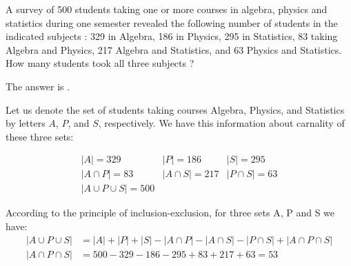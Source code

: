 \documentclass{ximera}
\begin{document}
\begin{question}
A survey of 500 students taking one or more courses in algebra,
physics and statistics during one semester revealed the following
number of students in the indicated subjects : 329 in Algebra, 186 in
Physics, 295 in Statistics, 83 taking Algebra and Physics, 217 Algebra
and Statistics, and 63 Physics and Statistics.  How many students took
all three subjects ?
\begin{solution}
The answer is . 
\end{solution}

Let us denote the set of students taking courses Algebra, Physics, and
Statistics by letters $A$, $P$, and $S$, respectively. We have this
information about carnality of these three sets:

\begin{equation*}
	\begin{array}{lll}
	 |A| = 329							& |P| = 186				& |S| = 295 \\
	 |A \cap P| = 83				& |A \cap S| = 217	& |P \cap S| = 63 \\
	 |A \cup P \cup S| = 500	& &
	\end{array}
\end{equation*}

According to the principle of inclusion-exclusion, for three sets A, P and S we have:
\begin{align*}
|A \cup P \cup S| &= |A| + |P| + |S| - |A \cap P| - |A \cap S| - |P \cap S| + |A \cap P \cap S|\\
|A \cap P \cap S| &= 500 - 329 - 186 - 295 + 83 + 217 + 63 = 53
\end{align*}
\end{question}
\end{document}
